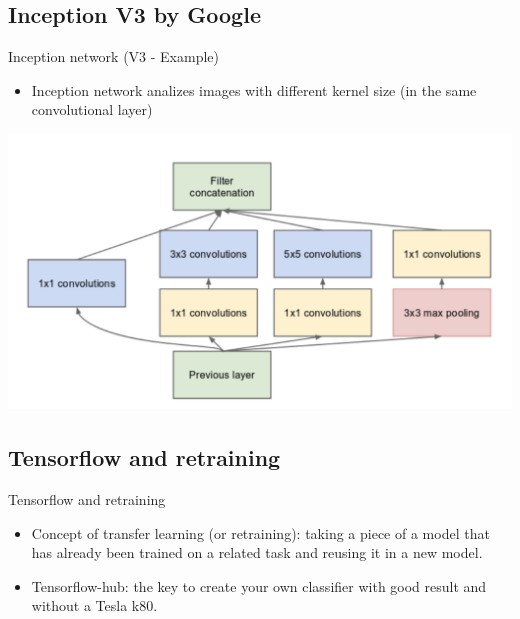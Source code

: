 \documentclass{beamer}
\begin{document}
\subsection{Inception V3 by Google}

\begin{frame}{Inception network (V3 - Example)}
	\begin{itemize}
		\setlength\itemsep{1em}
		[triangle]
		\item 
			Inception network analizes images with different kernel size (in the same convolutional layer)
	\end{itemize}
	\begin{center}
		\includegraphics[scale=0.35]{inception}
	\end{center}
\end{frame}

\subsection{Tensorflow and retraining}

\begin{frame}{Tensorflow and retraining}
	\begin{itemize}
		\setlength\itemsep{1em}
		[triangle]
		\item 
			Concept of transfer learning (or retraining):  taking a piece of a model that has already been trained on a related task and reusing it in a new model.
		\item 
			Tensorflow-hub: the key to create your own classifier with good result and without a Tesla k80.
	\end{itemize}
\end{frame}
\end{document}
